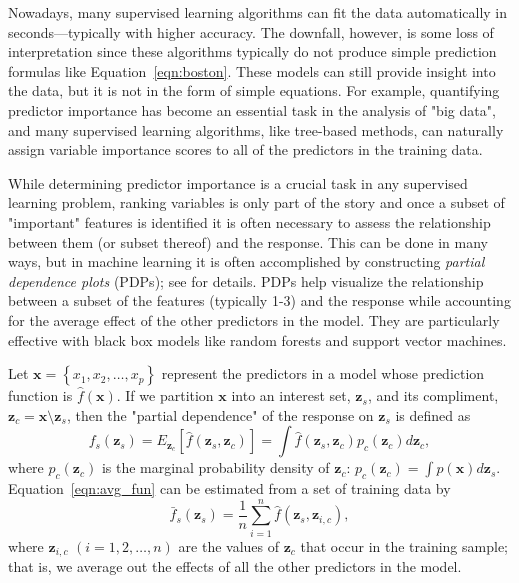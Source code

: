 \documentclass{article}
\begin{document}
Nowadays, many supervised learning algorithms can fit the data automatically in seconds---typically with higher accuracy. The downfall, however, is some loss of interpretation since these algorithms typically do not produce simple prediction formulas like Equation~\eqref{eqn:boston}. These models can still provide insight into the data, but it is not in the form of simple equations. For example, quantifying predictor importance has become an essential task in the analysis of "big data", and many supervised learning algorithms, like tree-based methods, can naturally assign variable importance scores to all of the predictors in the training data.

While determining predictor importance is a crucial task in any supervised learning problem, ranking variables is only part of the story and once a subset of "important" features is identified it is often necessary to assess the relationship between them (or subset thereof) and the response. This can be done in many ways, but in machine learning it is often accomplished by constructing \textit{partial dependence plots} (PDPs); see \citet{friedman-2001-greedy} for details. PDPs help visualize the relationship between a subset of the features (typically 1-3) and the response while accounting for the average effect of the other predictors in the model. They are particularly effective with black box models like random forests and support vector machines.

Let $\boldsymbol{x} = \left\{x_1, x_2, \dots, x_p\right\}$ represent the predictors in a model whose prediction function is $\widehat{f}\left(\boldsymbol{x}\right)$. If we partition $\boldsymbol{x}$ into an interest set, $\boldsymbol{z}_s$, and its compliment, $\boldsymbol{z}_c = \boldsymbol{x} \setminus \boldsymbol{z}_s$, then the "partial dependence" of the response on $\boldsymbol{z}_s$ is defined as
\begin{equation}
\label{eqn:avg_fun}
  f_s\left(\boldsymbol{z}_s\right) = E_{\boldsymbol{z}_c}\left[\widehat{f}\left(\boldsymbol{z}_s, \boldsymbol{z}_c\right)\right] = \int \widehat{f}\left(\boldsymbol{z}_s, \boldsymbol{z}_c\right)p_{c}\left(\boldsymbol{z}_c\right)d\boldsymbol{z}_c,
\end{equation}
where $p_{c}\left(\boldsymbol{z}_c\right)$ is the marginal probability density of $\boldsymbol{z}_c$: $p_{c}\left(\boldsymbol{z}_c\right) = \int p\left(\boldsymbol{x}\right)d\boldsymbol{z}_s$.
Equation~\eqref{eqn:avg_fun} can be estimated from a set of training data by
\begin{equation}
\label{eqn:pdf}
\bar{f}_s\left(\boldsymbol{z}_s\right) = \frac{1}{n}\sum_{i = 1}^n\widehat{f}\left(\boldsymbol{z}_s,\boldsymbol{z}_{i, c}\right),
\end{equation}
where $\boldsymbol{z}_{i, c}$ $\left(i = 1, 2, \dots, n\right)$ are the values of $\boldsymbol{z}_c$ that occur in the training sample; that is, we average out the effects of all the other predictors in the model.
\end{document}
